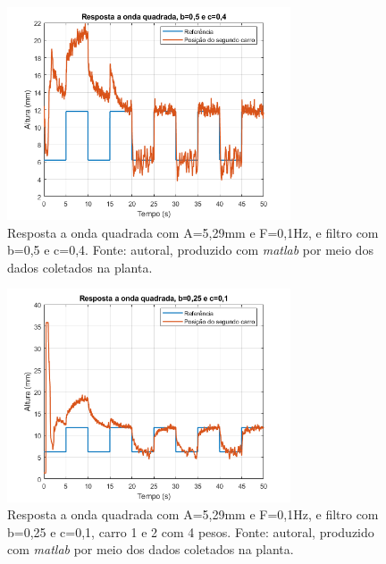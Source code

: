 \documentclass{ifacconf}
\begin{document}
\begin{figure}[!htb]
  \begin{center}
  \includegraphics[width=8.4cm]{figures/resultado_teste3.png}    %
  \caption{Resposta a onda quadrada com A=5,29mm e F=0,1Hz, e filtro com b=0,5 e c=0,4. Fonte: autoral, produzido com \textit{matlab} por meio dos dados coletados na planta.} 
  \label{fig:teste3}
  \end{center}
\end{figure}

\begin{figure}[!htb]
  \begin{center}
  \includegraphics[width=8.4cm]{figures/resultado_teste4.png}    %
  \caption{Resposta a onda quadrada com A=5,29mm e F=0,1Hz, e filtro com b=0,25 e c=0,1, carro 1 e 2 com 4 pesos. Fonte: autoral, produzido com \textit{matlab} por meio dos dados coletados na planta.} 
  \label{fig:teste4}
  \end{center}
\end{figure}
\end{document}
